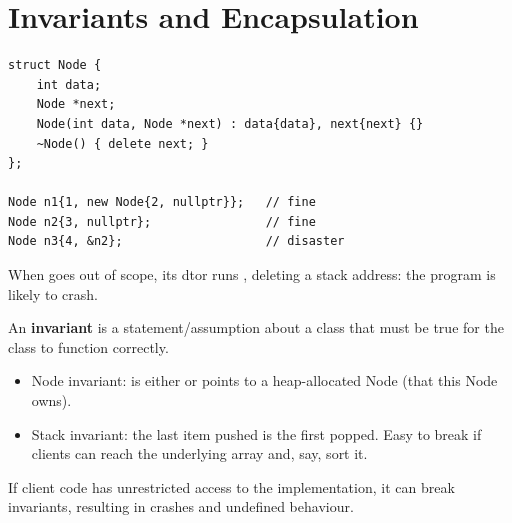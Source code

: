 \section{Invariants and Encapsulation}
\begin{lstlisting}[style=cpp]
struct Node {
    int data;
    Node *next;
    Node(int data, Node *next) : data{data}, next{next} {}
    ~Node() { delete next; }
};

Node n1{1, new Node{2, nullptr}};   // fine
Node n2{3, nullptr};                // fine
Node n3{4, &n2};                    // disaster
\end{lstlisting}
When  goes out of scope, its dtor runs , deleting a
stack address: the program is likely to crash.
\begin{center}
\end{center}

\begin{definition}
An \textbf{invariant} is a statement/assumption about a class that must be true
for the class to function correctly.
\end{definition}
\begin{itemize}
  \item Node invariant:  is either  or points to a
        heap-allocated Node (that this Node owns).
  \item Stack invariant: the last item pushed is the first popped. Easy to break
        if clients can reach the underlying array and, say, sort it.
\end{itemize}
If client code has unrestricted access to the implementation, it can break
invariants, resulting in crashes and undefined behaviour.

